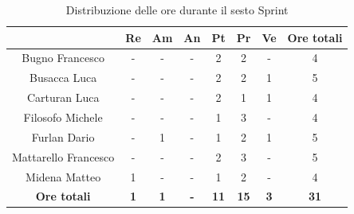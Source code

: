\begin{table}[H]
  \centering
  \renewcommand{\arraystretch}{1.8}
  \begin{tabular}{c|c|c|c|c|c|c|c}
    \rowcolor[HTML]{125E28}
    \multicolumn{1}{c}{\color[HTML]{FFFFFF}\textbf{ Nominativo }}
                         & \multicolumn{1}{c}{\color[HTML]{FFFFFF}\textbf{ Re }}
                         & \multicolumn{1}{c}{\color[HTML]{FFFFFF}\textbf{ Am}}
                         & \multicolumn{1}{c}{\color[HTML]{FFFFFF}\textbf{ An }}
                         & \multicolumn{1}{c}{\color[HTML]{FFFFFF}\textbf{ Pt }}
                         & \multicolumn{1}{c}{\color[HTML]{FFFFFF}\textbf{ Pr }}
                         & \multicolumn{1}{c}{\color[HTML]{FFFFFF}\textbf{ Ve }}
                         & \multicolumn{1}{c}{\color[HTML]{FFFFFF}\textbf{ Ore totali }}                                                                                  \\
    \hline
    Bugno Francesco      & -                                                             & -          & -          & 2           & 2           & -          & 4           \\
    Busacca Luca         & -                                                             & -          & -          & 2           & 2           & 1          & 5           \\
    Carturan Luca        & -                                                             & -          & -          & 2           & 1           & 1          & 4           \\
    Filosofo Michele     & -                                                             & -          & -          & 1           & 3           & -          & 4           \\
    Furlan Dario         & -                                                             & 1          & -          & 1           & 2           & 1          & 5           \\
    Mattarello Francesco & -                                                             & -          & -          & 2           & 3           & -          & 5           \\
    Midena Matteo        & 1                                                             & -          & -          & 1           & 2           & -          & 4           \\
    \textbf{Ore totali}  & \textbf{1}                                                    & \textbf{1} & \textbf{-} & \textbf{11} & \textbf{15} & \textbf{3} & \textbf{31}
  \end{tabular}
  \caption{Distribuzione delle ore durante il sesto Sprint}
\end{table}

